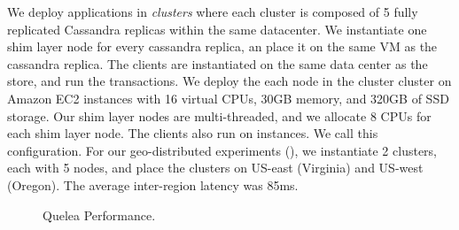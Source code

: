 We deploy \name applications in \emph{clusters} where each cluster is composed
of 5 fully replicated Cassandra replicas within the same datacenter. We
instantiate one shim layer node for every cassandra replica, an place it on the
same VM as the cassandra replica. The clients are instantiated on the same data
center as the store, and run the transactions. We deploy the each node in the
cluster cluster on  Amazon EC2 instances with 16 virtual CPUs,
30GB memory, and 320GB of SSD storage. Our shim layer nodes are multi-threaded,
and we allocate 8 CPUs for each shim layer node. The clients also run on
 instances. We call this  configuration. For our
geo-distributed experiments (), we instantiate 2 clusters, each with 5
nodes, and place the clusters on US-east (Virginia) and US-west (Oregon). The
average inter-region latency was 85ms.

\begin{figure}
  \centering
	\caption{Quelea Performance.}
  \label{grf:LWW_perf}
\end{figure}

